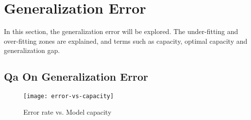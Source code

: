\documentclass{article}
\begin{document}
\section{Generalization Error}

In this section, the generalization error will be explored. The under-fitting and over-fitting zones are explained, and terms such as capacity, optimal capacity and generalization gap.

\subsection{Qa On Generalization Error}

\begin{figure}[H]
  \centering
    \texttt{[image: error-vs-capacity]}
    \caption{Error rate vs. Model capacity}
    \label{fig:Err_vs_cap}
\end{figure}
\end{document}
